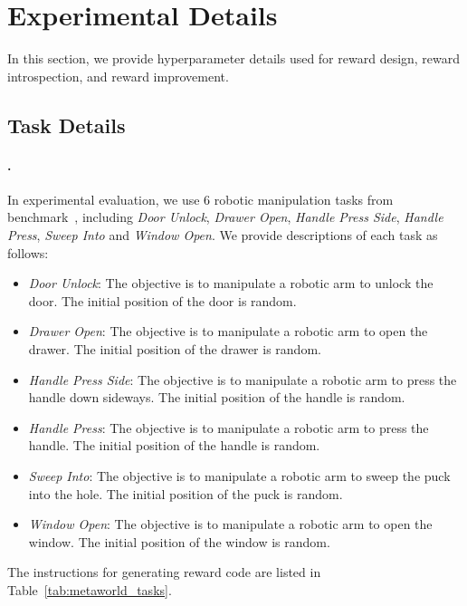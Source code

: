 \documentclass{article}
\theoremstyle{plain}
\theoremstyle{definition}
\theoremstyle{remark}
\begin{document}
\section{Experimental Details}\label{app:experimental_details}

In this section, we provide hyperparameter details used for reward design, reward introspection, and reward improvement.

\subsection{Task Details}\label{app:task_details}

\paragraph{\MW.}
In experimental evaluation, we use $6$ robotic manipulation tasks from \MW benchmark~\cite{Meta-World}, including \textit{Door Unlock}, \textit{Drawer Open}, \textit{Handle Press Side}, \textit{Handle Press}, \textit{Sweep Into} and \textit{Window Open}. We provide descriptions of each task as follows:
\begin{itemize}[leftmargin=20pt]
    \item \textit{Door Unlock}: The objective is to manipulate a robotic arm to unlock the door. The initial position of the door is random.
    \item \textit{Drawer Open}: The objective is to manipulate a robotic arm to open the drawer. The initial position of the drawer is random.
    \item \textit{Handle Press Side}: The objective is to manipulate a robotic arm to press the handle down sideways. The initial position of the handle is random.
    \item \textit{Handle Press}: The objective is to manipulate a robotic arm to press the handle. The initial position of the handle is random.
    \item \textit{Sweep Into}: The objective is to manipulate a robotic arm to sweep the puck into the hole. The initial position of the puck is random.
    \item \textit{Window Open}: The objective is to manipulate a robotic arm to open the window. The initial position of the window is random.
\end{itemize}
The instructions for generating reward code are listed in Table~\ref{tab:metaworld_tasks}.
\end{document}
